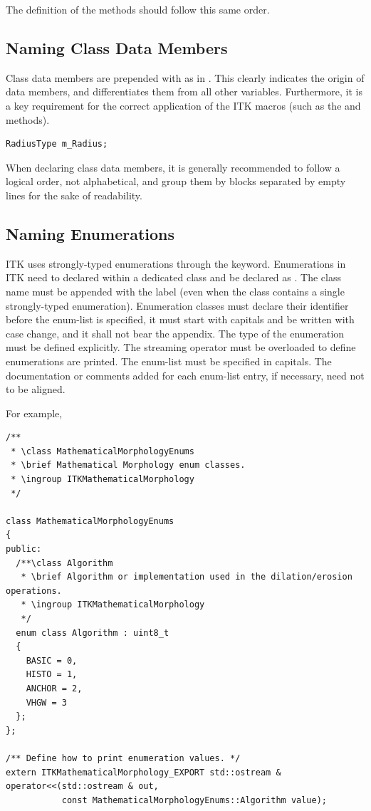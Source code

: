 The definition of the methods should follow this same order.


\subsection{Naming Class Data Members}%
\label{NamingClassDataMembers}

Class data members are prepended with  as in . This
clearly indicates the origin of data members, and differentiates them from all
other variables. Furthermore, it is a key requirement for the correct
application of the ITK macros (such as the  and
 methods).
\small
\begin{verbatim}
RadiusType m_Radius;
\end{verbatim}
\normalsize

When declaring class data members, it is generally recommended to follow a
logical order, not alphabetical, and group them by blocks separated by empty
lines for the sake of readability.


\subsection{Naming Enumerations}%
\label{subsec:NamingEnums}

ITK uses strongly-typed enumerations through the  keyword.
Enumerations in ITK need to declared within a dedicated class and be declared
as . The class name must be appended with the  label
(even when the class contains a single strongly-typed enumeration). Enumeration
classes must declare their identifier before the enum-list is specified, it
must start with capitals and be written with case change, and it shall not bear
the  appendix. The type of the enumeration must be defined
explicitly. The streaming operator \code{<<} must be overloaded to define
enumerations are printed. The enum-list must be specified in capitals. The
documentation or comments added for each enum-list entry, if necessary, need
not to be aligned.

For example,
\small
\begin{verbatim}
/**
 * \class MathematicalMorphologyEnums
 * \brief Mathematical Morphology enum classes.
 * \ingroup ITKMathematicalMorphology
 */

class MathematicalMorphologyEnums
{
public:
  /**\class Algorithm
   * \brief Algorithm or implementation used in the dilation/erosion operations.
   * \ingroup ITKMathematicalMorphology
   */
  enum class Algorithm : uint8_t
  {
    BASIC = 0,
    HISTO = 1,
    ANCHOR = 2,
    VHGW = 3
  };
};

/** Define how to print enumeration values. */
extern ITKMathematicalMorphology_EXPORT std::ostream &
operator<<(std::ostream & out,
           const MathematicalMorphologyEnums::Algorithm value);
\end{verbatim}
\normalsize


